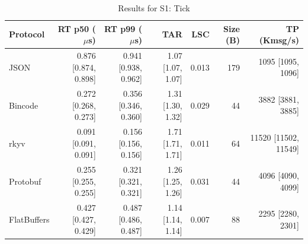 \begin{table}[htbp]
\centering
\caption{Results for S1: Tick}
\label{tab:results_tick}
\begin{tabular}{l r r r r r r}
\hline
Protocol & RT p50 ($\mu$s) & RT p99 ($\mu$s) & TAR & LSC & Size (B) & TP (Kmsg/s) \\
\hline
  JSON & 0.876 [0.874, 0.898] & 0.941 [0.938, 0.962] & 1.07 [1.07, 1.07] & 0.013 & 179 & 1095 [1095, 1096] \\
  Bincode & 0.272 [0.268, 0.273] & 0.356 [0.346, 0.360] & 1.31 [1.30, 1.32] & 0.029 & 44 & 3882 [3881, 3885] \\
  rkyv & 0.091 [0.091, 0.091] & 0.156 [0.156, 0.156] & 1.71 [1.71, 1.71] & 0.011 & 64 & 11520 [11502, 11549] \\
  Protobuf & 0.255 [0.255, 0.255] & 0.321 [0.321, 0.321] & 1.26 [1.25, 1.26] & 0.031 & 44 & 4096 [4090, 4099] \\
  FlatBuffers & 0.427 [0.427, 0.429] & 0.487 [0.486, 0.487] & 1.14 [1.14, 1.14] & 0.007 & 88 & 2295 [2280, 2301] \\
\hline
\end{tabular}
\end{table}